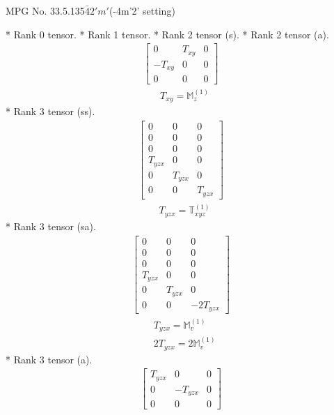 \documentclass[fleqn,8pt,landscape]{jsarticle}
\begin{document}
\setcounter{MaxMatrixCols}{32}

\renewcommand{\tablename}{Table~}
\renewcommand{\figurename}{Figure~}
\begin{center}
\LARGE
MPG No. 33.5.135\quad$\bar{4}2'm'$\quad(-4m'2' setting)
\end{center}
* Rank 0 tensor.
* Rank 1 tensor.
* Rank 2 tensor (s).
* Rank 2 tensor (a).
\begin{align*}
\begin{bmatrix} 0 & T_{xy} & 0 \\ - T_{xy} & 0 & 0 \\ 0 & 0 & 0 \end{bmatrix}
\end{align*}
\begin{align*}
& T_{xy} = \mathbb{M}_{z}^{(1)}
\end{align*}
* Rank 3 tensor (ss).
\begin{align*}
\begin{bmatrix} 0 & 0 & 0 \\ 0 & 0 & 0 \\ 0 & 0 & 0 \\ T_{yzx} & 0 & 0 \\ 0 & T_{yzx} & 0 \\ 0 & 0 & T_{yzx} \end{bmatrix}
\end{align*}
\begin{align*}
& T_{yzx} = \mathbb{T}_{xyz}^{(1)}
\end{align*}
* Rank 3 tensor (sa).
\begin{align*}
\begin{bmatrix} 0 & 0 & 0 \\ 0 & 0 & 0 \\ 0 & 0 & 0 \\ T_{yzx} & 0 & 0 \\ 0 & T_{yzx} & 0 \\ 0 & 0 & - 2 T_{yzx} \end{bmatrix}
\end{align*}
\begin{align*}
& T_{yzx} = \mathbb{M}_{v}^{(1)} \\
& 2 T_{yzx} = 2 \mathbb{M}_{v}^{(1)}
\end{align*}
* Rank 3 tensor (a).
\begin{align*}
\begin{bmatrix} T_{yzx} & 0 & 0 \\ 0 & - T_{yzx} & 0 \\ 0 & 0 & 0 \end{bmatrix}
\end{align*}
\end{document}
